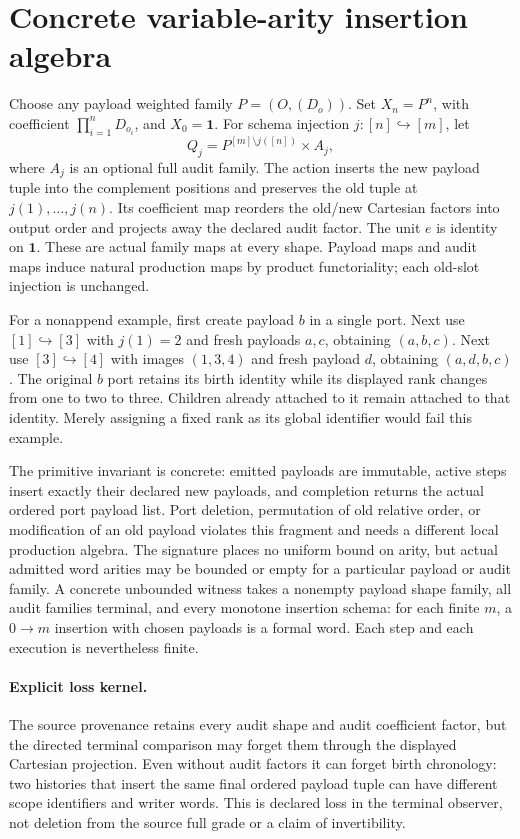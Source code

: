 \documentclass[11pt]{article}
\begin{document}
\section{Concrete variable-arity insertion algebra}
Choose any payload weighted family $P=(O,(D_o))$. Set $X_n=P^n$, with coefficient $\prod_{i=1}^nD_{o_i}$, and $X_0=\mathbf1$. For schema injection $j:[n]\hookrightarrow[m]$, let
\[
 Q_j=P^{[m]\setminus j([n])}\times A_j,
\]
where $A_j$ is an optional full audit family. The action inserts the new payload tuple into the complement positions and preserves the old tuple at $j(1),\ldots,j(n)$. Its coefficient map reorders the old/new Cartesian factors into output order and projects away the declared audit factor. The unit $e$ is identity on $\mathbf1$. These are actual family maps at every shape. Payload maps and audit maps induce natural production maps by product functoriality; each old-slot injection is unchanged.

For a nonappend example, first create payload $b$ in a single port. Next use $[1]\hookrightarrow[3]$ with $j(1)=2$ and fresh payloads $a,c$, obtaining $(a,b,c)$. Next use $[3]\hookrightarrow[4]$ with images $(1,3,4)$ and fresh payload $d$, obtaining $(a,d,b,c)$. The original $b$ port retains its birth identity while its displayed rank changes from one to two to three. Children already attached to it remain attached to that identity. Merely assigning a fixed rank as its global identifier would fail this example.

The primitive invariant is concrete: emitted payloads are immutable, active steps insert exactly their declared new payloads, and completion returns the actual ordered port payload list. Port deletion, permutation of old relative order, or modification of an old payload violates this fragment and needs a different local production algebra. The signature places no uniform bound on arity, but actual admitted word arities may be bounded or empty for a particular payload or audit family. A concrete unbounded witness takes a nonempty payload shape family, all audit families terminal, and every monotone insertion schema: for each finite $m$, a $0\to m$ insertion with chosen payloads is a formal word. Each step and each execution is nevertheless finite.

\paragraph{Explicit loss kernel.} The source provenance retains every audit shape and audit coefficient factor, but the directed terminal comparison may forget them through the displayed Cartesian projection. Even without audit factors it can forget birth chronology: two histories that insert the same final ordered payload tuple can have different scope identifiers and writer words. This is declared loss in the terminal observer, not deletion from the source full grade or a claim of invertibility.
\end{document}
